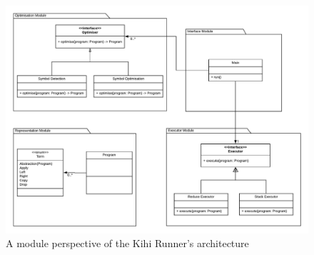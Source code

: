 \begin{figure}[!htb]
    \centering
    \includegraphics[width=\textwidth]{04_implementation/images/architecture}
    \caption{A module perspective of the Kihi Runner's architecture}
    \label{fig:architecture}
\end{figure}
